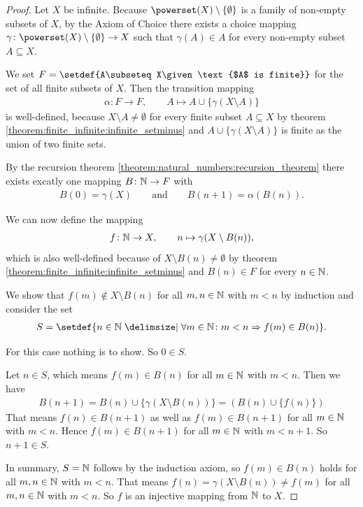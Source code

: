 \begin{proof}
    Let $X$ be infinite. Because $\powerset(X)\setminus\{\emptyset\}$ is a family of non-empty subsets of $X$, by the Axiom of Choice there exists a choice mapping $\gamma \colon \powerset(X)\setminus\{\emptyset\} \to X$ such that $\gamma(A) \in A$ for every non-empty subset $A \subseteq X$.

    We set $F=\setdef{A\subseteq X\given \text{$A$ is finite}}$ for the set of all finite subsets of $X$. Then the transition mapping
    \begin{align}\alpha\colon F\to F,\qquad A\mapsto A\cup\{\gamma(X\setminus A)\}\end{align}
    is well-defined, because $X\setminus A\neq\emptyset$ for every finite subset $A\subseteq X$ by theorem \ref{theorem:finite_infinite:infinite_setminus} and $A\cup\{\gamma(X\setminus A)\}$ is finite as the union of two finite sets.
    
    By the recursion theorem \ref{theorem:natural_numbers:recursion_theorem} there exists excatly one mapping $B\colon\mathbb{N}\to F$ with
    \begin{align}
        B(0)=\gamma(X)\qquad\text{and}\qquad B(n+1)=\alpha(B(n)).
    \end{align}

    We can now define the mapping
    \begin{align}f\colon \mathbb{N}\to X,\qquad n\mapsto \gamma(X\setminus B(n)),\end{align}
    which is also well-defined because of $X\setminus B(n)\neq\emptyset$ by theorem \ref{theorem:finite_infinite:infinite_setminus} and $B(n)\in F$ for every $n\in\mathbb{N}$.

    We show that $f(m)\notin X\setminus B(n)$ for all $m,n\in\mathbb{N}$ with $m<n$ by induction and consider the set
    \begin{align}S=\setdef{n\in\setN\given \forall m\in\setN\colon m<n\Rightarrow f(m)\in B(n)}.\end{align}
    
     For this case nothing is to show. So $0\in S$.

     Let $n\in S$, which means $f(m)\in B(n)$ for all $m\in\mathbb{N}$ with $m<n$. Then we have
    \begin{align}
        B(n+1)=B(n)\cup\{\gamma(X\setminus B(n))\}=(B(n)\cup\{f(n)\})
    \end{align}
    That means $f(n)\in B(n+1)$ as well as $f(m)\in B(n+1)$ for all $m\in\mathbb{N}$ with $m<n$. Hence $f(m)\in B(n+1)$ for all $m\in\mathbb{N}$ with $m<n+1$. So $n+1\in S$.

    In summary, $S=\mathbb{N}$ follows by the induction axiom, so $f(m)\in B(n)$ holds for all $m,n\in\mathbb{N}$ with $m<n$. That means $f(n)=\gamma(X\setminus B(n))\neq f(m)$ for all $m,n\in\mathbb{N}$ with $m<n$. So $f$ is an injective mapping from $\mathbb{N}$ to $X$.
\end{proof}

